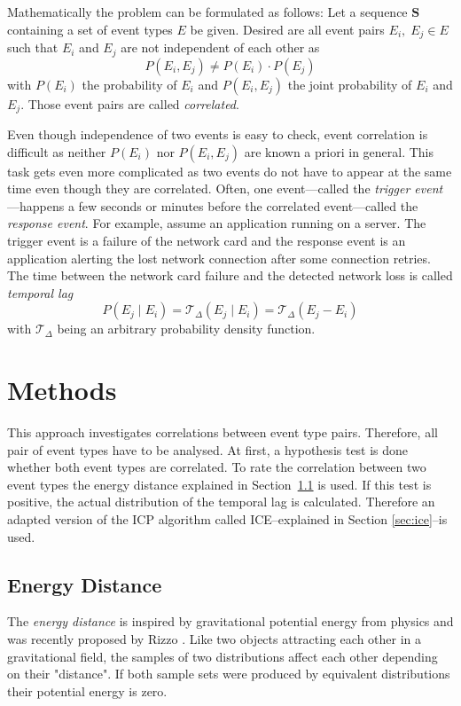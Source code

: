 \documentclass[conference]{IEEEtran}
\theoremstyle{examplestyle}
\begin{document}
Mathematically the problem can be formulated as follows: Let a sequence \(\pmb{S}\) containing a set of event types \(E\) be given. Desired are all event pairs \(E_i, \; E_j \in E\) such that \(E_i\) and \(E_j\) are not independent of each other as
\begin{equation}
	P(E_i, E_j) \neq P(E_i) \cdot P(E_j)
\end{equation}
with \(P(E_i)\) the probability of \(E_i\) and \(P(E_i, E_j)\) the joint probability of \(E_i\) and \(E_j\). Those event pairs are called \textit{correlated}.

Even though independence of two events is easy to check, event correlation is difficult as neither \(P(E_i)\) nor \(P(E_i, E_j)\) are known a priori in general. This task gets even more complicated as two events do not have to appear at the same time even though they are correlated. Often, one event---called the \textit{trigger event}---happens a few seconds or minutes before the correlated event---called the \textit{response event}. For example, assume an application running on a server. The trigger event is a failure of the network card and the response event is an application alerting the lost network connection after some connection retries. The time between the network card failure and the detected network loss is called \textit{temporal lag}
\begin{equation}
	P(E_j \; | \; E_i) = \mathcal{T}_\Delta (E_j \; | \; E_i) = \mathcal{T}_\Delta (E_j - E_i)
\end{equation}
with \(\mathcal{T}_\Delta\) being an arbitrary probability density function.



\section{Methods}
This approach investigates correlations between event type pairs. Therefore, all pair of event types have to be analysed. At first, a hypothesis test is done whether both event types are correlated. To rate the correlation between two event types the energy distance \cite{Rizzo2016} explained in Section~\ref{sec:energyDistance} is used. If this test is positive, the actual distribution of the temporal lag is calculated. Therefore an adapted version of the \ac{ICP} algorithm called \ac{ICE}--explained in Section \ref{sec:ice}--is used.




\subsection{Energy Distance}
\label{sec:energyDistance}
The \textit{energy distance} is inspired by gravitational potential energy from physics and was recently proposed by Rizzo \cite{Rizzo2016}. Like two objects attracting each other in a gravitational field, the samples of two distributions affect each other depending on their "distance". If both sample sets were produced by equivalent distributions their potential energy is zero.
\end{document}
